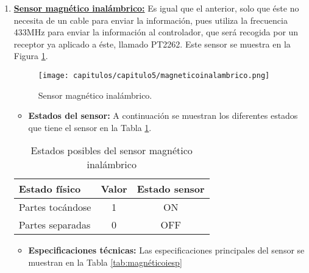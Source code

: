 \begin{enumerate}
\item \underline{\textbf{Sensor magnético inalámbrico:}} Es igual que el anterior, solo que éste no necesita de un cable para enviar la información, pues utiliza la frecuencia 433MHz para enviar la información al controlador, que será recogida por un receptor ya aplicado a éste, llamado PT2262. Este sensor se muestra en la Figura \ref{fig:magnéticoi}.

\begin{figure}[h] 
    \centering
    \texttt{[image: capitulos/capitulo5/magneticoinalambrico.png]}
    \caption{Sensor magnético inalámbrico.}
    \label{fig:magnéticoi}
\end{figure}

\begin{itemize}
    \item \textbf{Estados del sensor:} A continuación se muestran los diferentes estados que tiene el sensor en la Tabla \ref{tab:magnéticoi}.
\end{itemize}

\begin{table}[h]
    \centering
    \begin{tabular}{|l|c|c|}
        \rowcolor[gray]{.5}
        \hline
         \color{white}Estado físico&\color{white}Valor&\color{white}Estado sensor \\
         \hline
         Partes tocándose&1&ON \\
         \hline
         Partes separadas&0&OFF  \\
         \hline
    \end{tabular}
    \caption{Estados posibles del sensor magnético inalámbrico}
    \label{tab:magnéticoi}
\end{table}

\begin{itemize}
    \item \textbf{Especificaciones técnicas:} Las especificaciones principales del sensor se muestran en la Tabla \ref{tab:magnéticoiesp}
\end{itemize}


\end{enumerate}
